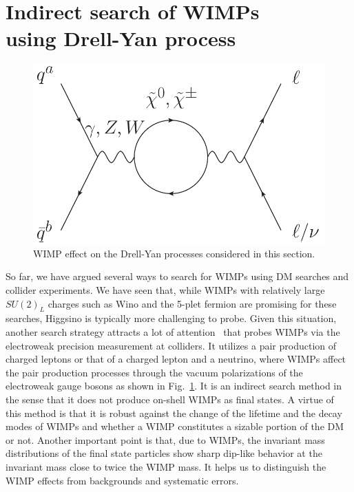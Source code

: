 \documentclass[12pt,twoside,book]{article}
\begin{document}
\section[Indirect search of WIMPs using Drell-Yan process]{
  Indirect search of WIMPs\\
  using Drell-Yan process
}
\label{sec:dy}
\setcounter{equation}{0}

\vskip 0.1in


\begin{figure}[b]
  \centering
  \includegraphics[width=0.5\hsize]{NC_CC_WIMP.pdf}
  \caption{WIMP effect on the Drell-Yan processes considered in this section.
  }
  \label{fig:NC_CC_WIMP}
\end{figure}

So far, we have argued several ways to search for WIMPs using DM searches and collider experiments.
We have seen that, while WIMPs with relatively large $SU(2)_L$ charges such as Wino and the 5-plet fermion are promising for these searches, Higgsino is typically more challenging to probe.
Given this situation, another search strategy attracts a lot of attention~\cite{Chigusa:2018vxz, Abe:2019egv, Alves:2014cda, Harigaya:2015yaa, Gross:2016ioi, Farina:2016rws, Matsumoto:2017vfu, DiLuzio:2018jwd, Matsumoto:2018ioi} that probes WIMPs via the electroweak precision measurement at colliders.
It utilizes a pair production of charged leptons or that of a charged lepton and a neutrino, where WIMPs affect the pair production processes through the vacuum polarizations of the electroweak gauge bosons as shown in Fig.~\ref{fig:NC_CC_WIMP}.
It is an indirect search method in the sense that it does not produce on-shell WIMPs as final states.
A virtue of this method is that it is robust against the change of the lifetime and the decay modes of WIMPs and whether a WIMP constitutes a sizable portion of the DM or not.
Another important point is that, due to WIMPs, the invariant mass distributions of the final state particles show sharp dip-like behavior at the invariant mass close to twice the WIMP mass.
It helps us to distinguish the WIMP effects from backgrounds and systematic errors.
\end{document}
